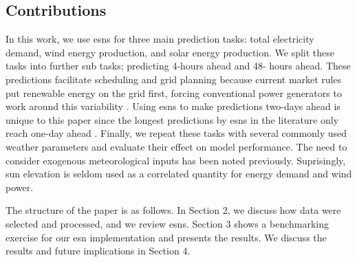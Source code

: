 \subsection{Contributions}
In this work, we use \glspl{esn} for three main prediction tasks: total
electricity demand, wind energy production, and solar energy production. We
split these tasks into further sub tasks; predicting 4-hours ahead and 48-
hours ahead. These predictions facilitate scheduling and grid planning
because current market rules put renewable energy on the grid first, forcing
conventional power generators to work around this variability
\cite{wang_quantifying_2016}. Using \glspl{esn} to make predictions two-days
ahead is unique to this paper since the longest predictions by \glspl{esn} in the
literature only reach one-day ahead \cite{deihimi_application_2012}. Finally, we
repeat these tasks with several commonly used weather parameters and evaluate
their effect on model performance. The need to consider exogenous meteorological
inputs has been noted previously. Suprisingly, sun elevation is seldom used as a
correlated quantity for energy demand and wind power.

The structure of the paper is as follows. In Section 2, we discuss how data
were selected and processed, and we review \glspl{esn}. Section 3 shows a
benchmarking
exercise for our \gls{esn} implementation and presents the results. We discuss
the results and future implications in Section 4.
